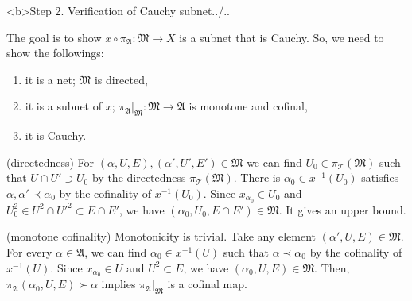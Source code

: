 \documentclass[11pt]{amsart}
\begin{document}
\begin{pf}
<b>Step 2. Verification of Cauchy subnet../..

The goal is to show $x\circ\pi_\mathfrak{A}:\mathfrak{M}\to X$ is a subnet that is Cauchy.
So, we need to show the followings:
\begin{enumerate}
\item it is a net; $\mathfrak{M}$ is directed,
\item it is a subnet of $x$; $\pi_\mathfrak{A}|_\mathfrak{M}:\mathfrak{M}\to\mathfrak{A}$ is monotone and cofinal,
\item it is Cauchy.
\end{enumerate}

(directedness)
For $(\alpha,U,E),(\alpha',U',E')\in\mathfrak{M}$ we can find $U_0\in\pi_\mathcal{T}(\mathfrak{M})$ such that $U\cap U'\supset U_0$ by the directedness $\pi_\mathcal{T}(\mathfrak{M})$.
There is $\alpha_0\in x^{-1}(U_0)$ satisfies $\alpha,\alpha'\prec\alpha_0$ by the cofinality of $x^{-1}(U_0)$.
Since $x_{\alpha_0}\in U_0$ and $U_0^2\in U^2\cap U'^2\subset E\cap E'$, we have $(\alpha_0,U_0,E\cap E')\in\mathfrak{M}$.
It gives an upper bound.

(monotone cofinality)
Monotonicity is trivial.
Take any element $(\alpha',U,E)\in\mathfrak{M}$.
For every $\alpha\in\mathfrak{A}$, we can find $\alpha_0\in x^{-1}(U)$ such that $\alpha\prec\alpha_0$ by the cofinality of $x^{-1}(U)$.
Since $x_{\alpha_0}\in U$ and $U^2\subset E$, we have $(\alpha_0,U,E)\in\mathfrak{M}$.
Then, $\pi_\mathfrak{A}(\alpha_0,U,E)\succ\alpha$ implies $\pi_\mathfrak{A}|_\mathfrak{M}$ is a cofinal map.


\end{pf}
\end{document}
